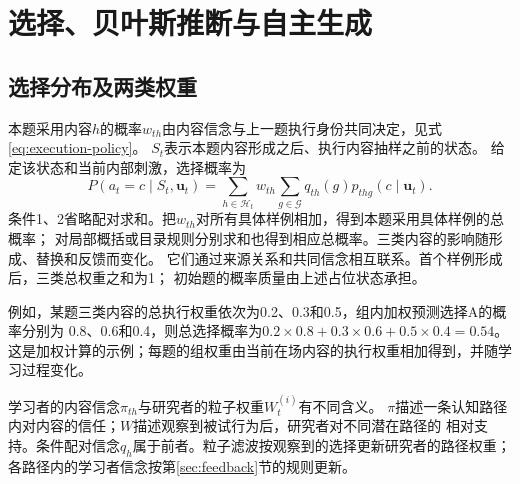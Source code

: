 \documentclass[11pt,a4paper]{article}
\numberwithin{equation}{section}
\begin{document}
\section{选择、贝叶斯推断与自主生成}
\label{sec:inference}

\subsection{选择分布及两类权重}
本题采用内容$h$的概率$w_{th}$由内容信念与上一题执行身份共同决定，见式\eqref{eq:execution-policy}。
$S_t$表示本题内容形成之后、执行内容抽样之前的状态。
给定该状态和当前内部刺激，选择概率为
\begin{equation}
P(a_t=c\mid S_t,\bm u_t)=\sum_{h\in\mathcal H_t}w_{th}
\sum_{g\in\mathcal G}q_{th}(g)p_{thg}(c\mid\bm u_t).
\label{eq:choice}
\end{equation}
条件1、2省略配对求和。把$w_{th}$对所有具体样例相加，得到本题采用具体样例的总概率；
对局部概括或目录规则分别求和也得到相应总概率。三类内容的影响随形成、替换和反馈而变化。
它们通过来源关系和共同信念相互联系。首个样例形成后，三类总权重之和为1；
初始题的概率质量由上述占位状态承担。

例如，某题三类内容的总执行权重依次为0.2、0.3和0.5，组内加权预测选择A的概率分别为
0.8、0.6和0.4，则总选择概率为$0.2\times0.8+0.3\times0.6+0.5\times0.4=0.54$。
这是加权计算的示例；每题的组权重由当前在场内容的执行权重相加得到，并随学习过程变化。

学习者的内容信念$\pi_{th}$与研究者的粒子权重$W_t^{(i)}$有不同含义。
$\pi$描述一条认知路径内对内容的信任；$W$描述观察到被试行为后，研究者对不同潜在路径的
相对支持。条件配对信念$q_h$属于前者。粒子滤波按观察到的选择更新研究者的路径权重；
各路径内的学习者信念按第\ref{sec:feedback}节的规则更新。
\end{document}
